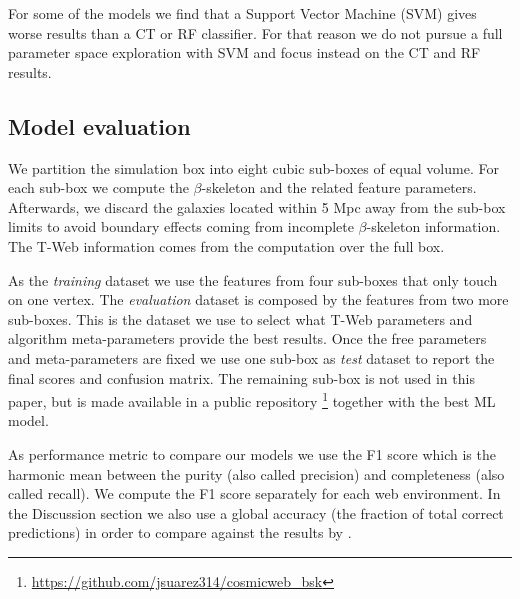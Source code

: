 \documentclass[usenatbib]{mnras}
\begin{document}
For some of the models we find that a Support Vector Machine (SVM) gives worse results than a CT or RF classifier.
For that reason we do not pursue a full parameter space exploration with SVM and focus instead on the CT and RF results.


\subsection{Model evaluation}

We partition the simulation box into eight cubic sub-boxes of equal volume.
For each sub-box we compute the $\beta$-skeleton and the related feature parameters.
Afterwards, we discard the galaxies located within 5 Mpc away from the sub-box limits to avoid boundary effects coming from incomplete $\beta$-skeleton information.
The T-Web information comes from the computation over the full box.

As the \emph{training} dataset we use the features from four sub-boxes that only touch on one vertex.
The \emph{evaluation} dataset is composed by the features from two more sub-boxes.
This is the dataset we use to select what T-Web parameters and algorithm meta-parameters provide the best results.
Once the free parameters and meta-parameters are fixed we use one sub-box as \emph{test} dataset to report the final scores and confusion matrix.
The remaining sub-box is not used in this paper, but is made available in a public repository \footnote{\url{https://github.com/jsuarez314/cosmicweb_bsk}} together with the best ML model. 


As performance metric to compare our models we use the F1 score which is the harmonic mean between the purity (also called precision) and completeness (also called recall).
We compute the F1 score separately for each web environment.
In the Discussion section we also use a global accuracy (the fraction of total correct predictions) in order to compare against the results by \cite{Tsizh2019}.
\end{document}
